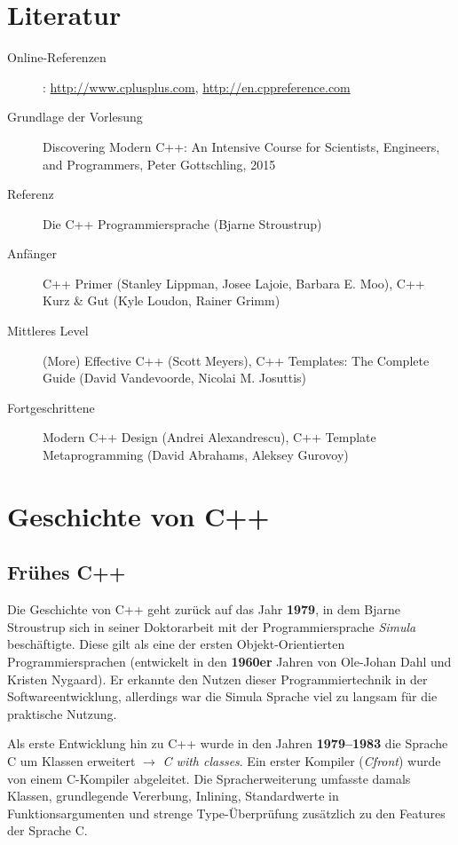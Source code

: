 \section{Literatur}
\begin{description}
\item[Online-Referenzen]: \url{http://www.cplusplus.com}, \url{http://en.cppreference.com}
\item[Grundlage der Vorlesung] Discovering Modern C++: An Intensive Course for Scientists, Engineers, and Programmers, Peter Gottschling, 2015
\item[Referenz] Die C++ Programmiersprache (Bjarne Stroustrup)
\item[Anfänger] C++ Primer (Stanley Lippman, Josee Lajoie, Barbara E. Moo), C++ Kurz \& Gut (Kyle Loudon, Rainer Grimm)
\item[Mittleres Level] (More) Effective C++ (Scott Meyers), C++ Templates: The Complete Guide (David Vandevoorde, Nicolai M. Josuttis)
\item[Fortgeschrittene] Modern C++ Design (Andrei Alexandrescu), C++ Template Metaprogramming (David Abrahams, Aleksey Gurovoy)
\end{description}

\section{Geschichte von C++}
\subsection{Frühes C++}
Die Geschichte von C++ geht zurück auf das Jahr \textbf{1979}, in dem Bjarne Stroustrup sich in seiner Doktorarbeit mit der Programmiersprache \textit{Simula} beschäftigte. Diese gilt als eine der ersten Objekt-Orientierten Programmiersprachen (entwickelt in den \textbf{1960er} Jahren von Ole-Johan Dahl und Kristen Nygaard). Er erkannte den Nutzen dieser Programmiertechnik in der Softwareentwicklung, allerdings war die Simula Sprache viel zu langsam für die praktische Nutzung.

Als erste Entwicklung hin zu C++ wurde in den Jahren \textbf{1979--1983} die Sprache C um Klassen erweitert $\rightarrow$ \textit{C with classes}. Ein erster Kompiler (\textit{Cfront}) wurde von einem C-Kompiler abgeleitet. Die Spracherweiterung umfasste damals Klassen, grundlegende Vererbung, Inlining, Standardwerte in Funktionsargumenten und strenge Type-Überprüfung zusätzlich zu den Features der Sprache C.

